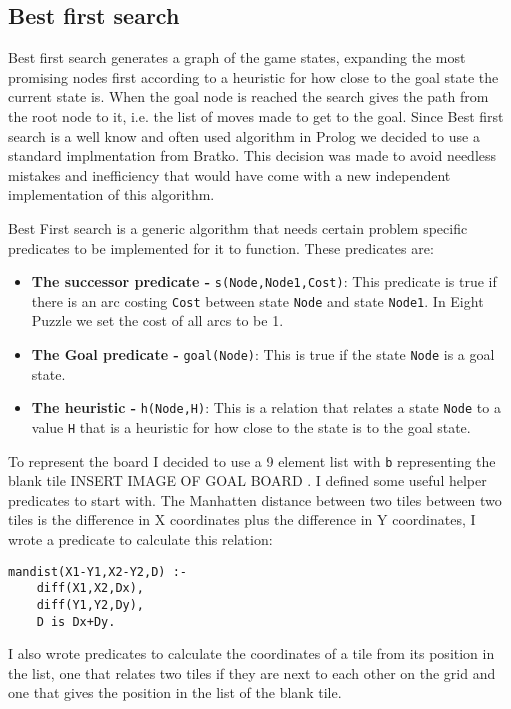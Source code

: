 \documentclass[a4paper,10pt]{report}
\begin{document}
\subsection{Best first search}
Best first search generates a graph of the game states, expanding the most promising nodes first according to a heuristic for how close to the goal state the current state is. When the goal node is reached the search gives the path from the root node to it, i.e. the list of moves made to get to the goal.
Since Best first search is a well know and often used algorithm in Prolog we decided to use a standard implmentation from Bratko\cite{Bratko}. This decision was made to avoid needless mistakes and inefficiency that would have come with a new independent implementation of this algorithm.

Best First search is a generic algorithm that needs certain problem specific predicates to be implemented for it to function. These predicates are:
\begin{itemize}
\item \textbf{The successor predicate - }\texttt{s(Node,Node1,Cost)}: This predicate is true if there is an arc costing \texttt{Cost} between state \texttt{Node} and state \texttt{Node1}. In Eight Puzzle we set the cost of all arcs to be 1.
\item \textbf{The Goal predicate - }\texttt{goal(Node)}: This is true if the state \texttt{Node} is a goal state.
\item \textbf{The heuristic - }\texttt{h(Node,H)}: This is a relation that relates a state \texttt{Node} to a value \texttt{H} that is a heuristic for how close to the state is to the goal state.
\end{itemize}
To represent the board I decided to use a 9 element list with \texttt{b} representing the blank tile INSERT IMAGE OF GOAL BOARD .
I defined some useful helper predicates to start with. The Manhatten distance between two tiles between two tiles is the difference in X coordinates plus the difference in Y coordinates, I wrote a predicate to calculate this relation:
\begin{verbatim}
mandist(X1-Y1,X2-Y2,D) :-
    diff(X1,X2,Dx),
    diff(Y1,Y2,Dy),
    D is Dx+Dy.
\end{verbatim}
I also wrote predicates to calculate the coordinates of a tile from its position in the list, one that relates two tiles if they are next to each other on the grid and one that gives the position in the list of the blank tile.
\end{document}
